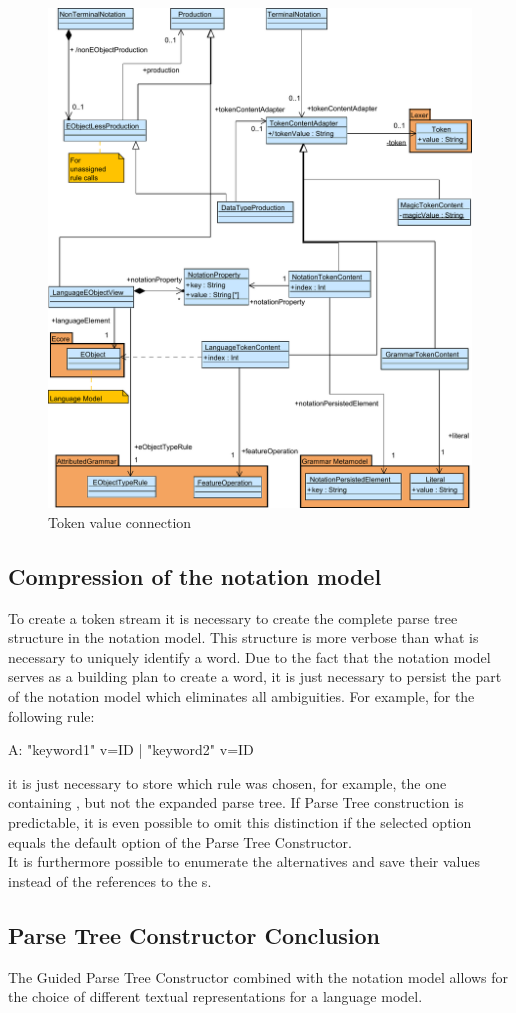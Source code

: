 \begin{figure}
\centering
\includegraphics[scale=0.68]{gfx/ex/Notation_DataLink} 
\caption{Token value connection}
\label{MM:Not:DataLink}
\end{figure}

\subsection{Compression of the notation model}
To create a token stream it is necessary to create the complete parse tree structure in the notation model. This structure is more verbose than what is necessary to uniquely identify a word. Due to the fact that the notation model serves as a building plan to create a word, it is just necessary to persist the part of the notation model which eliminates all ambiguities. For example, for the following rule:
\begin{xtxt}
A:  "keyword1" v=ID 
 |  "keyword2" v=ID
\end{xtxt}
it is just necessary to store which rule was chosen, for example, the one containing , but not the expanded parse tree. If Parse Tree construction is predictable, it is even possible to omit this distinction if the selected option equals the default option of the Parse Tree Constructor.  \\
It is furthermore possible to enumerate the alternatives and save their values instead of the references to the s.

\subsection{Parse Tree Constructor Conclusion}
The Guided Parse Tree Constructor combined with the notation model allows for the choice of different textual representations for a language model. 



